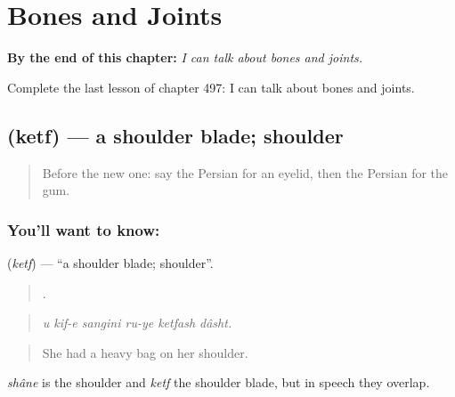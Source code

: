 
\chapter{Bones and Joints}
\label{ch:fa-bones-and-joints}

\begin{chapteropening}
\textbf{By the end of this chapter:} \emph{I can talk about bones and joints.}

Complete the last lesson of chapter 497: I can talk about bones and joints.
\end{chapteropening}

\section[\texorpdfstring{\fa{کتف} (ketf)}{کتف (ketf)}]{ (ketf) — a shoulder blade; shoulder}

\label{lesson:FA-C497-ketf}



\begin{quote}
Before the new one: say the Persian for an eyelid, then the Persian for the gum.
\end{quote}

\subsection*{You'll want to know: }
\textbf{} (\emph{ketf}) — \textquotedblleft{}a shoulder blade; shoulder\textquotedblright{}.

\begin{quote}
     .
\end{quote}

\begin{quote}
\emph{u kif-e sangini ru-ye ketfash dâsht.}
\end{quote}

\begin{quote}
She had a heavy bag on her shoulder.
\end{quote}

\emph{shâne} is the shoulder and \emph{ketf} the shoulder blade, but in speech they overlap.

